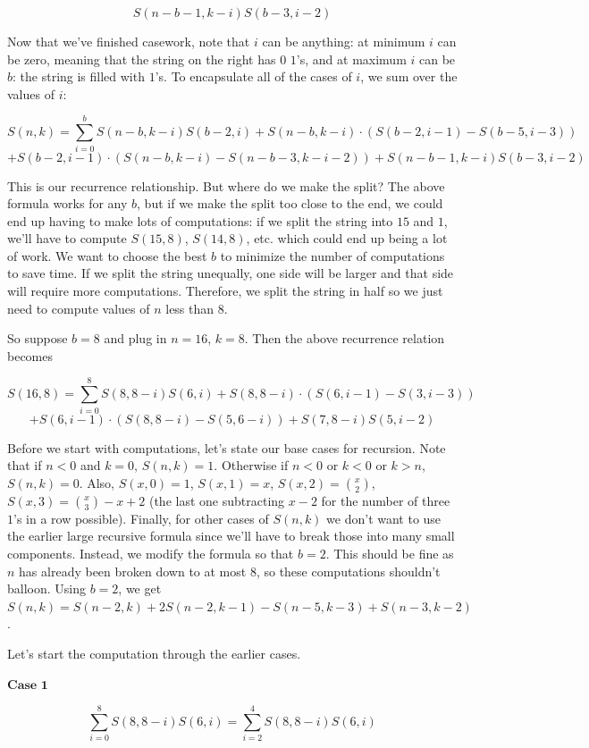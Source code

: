 \begin{enumerate}
 
 \[S(n-b-1,k-i)S(b-3,i-2)\]

 


 Now that we've finished casework, note that $i$ can be anything: at minimum $i$ can be zero, meaning that the string on the right has $0$ $1$'s, and at maximum $i$ can be $b$: the string is filled with $1$'s. To encapsulate all of the cases of $i$, we sum over the values of $i$:

 
 \[S(n,k) = \sum_{i = 0}^{b} S(n-b, k-i)S(b-2, i) + S(n-b,k-i) \cdot (S(b-2, i-1)-S(b-5, i-3))\]
 \[+ S(b-2, i-1) \cdot (S(n-b, k-i)-S(n-b-3, k-i-2)) + S(n-b-1,k-i)S(b-3,i-2)\]

 
This is our recurrence relationship. But where do we make the split? The above formula works for any $b$, but if we make the split too close to the end, we could end up having to make lots of computations: if we split the string into $15$ and $1$, we'll have to compute $S(15,8)$, $S(14,8)$, etc. which could end up being a lot of work. We want to choose the best $b$ to minimize the number of computations to save time. If we split the string unequally, one side will be larger and that side will require more computations. Therefore, we split the string in half so we just need to compute values of $n$ less than $8$.

 So suppose $b = 8$ and plug in $n=16$, $k=8$. Then the above recurrence relation becomes 

 
 \[S(16,8) = \sum_{i = 0}^{8} S(8, 8-i)S(6, i) + S(8,8-i) \cdot (S(6, i-1)-S(3, i-3))\]
 \[+ S(6, i-1) \cdot (S(8, 8-i)-S(5, 6-i)) + S(7,8-i)S(5,i-2)\]

 
Before we start with computations, let's state our base cases for recursion. Note that if $n<0$ and $k = 0$, $S(n,k) = 1$. Otherwise if $n<0$ or $k<0$ or $k>n$, $S(n,k) = 0$. Also, $S(x,0) = 1$, $S(x,1) = x$, $S(x,2) = \binom{x}{2}$, $S(x,3) = \binom{x}{3}-x+2$ (the last one subtracting $x-2$ for the number of three $1$'s in a row possible). Finally, for other cases of $S(n,k)$ we don't want to use the earlier large recursive formula since we'll have to break those into many small components. Instead, we modify the formula so that $b=2$. This should be fine as $n$ has already been broken down to at most $8$, so these computations shouldn't balloon. Using $b=2$, we get $S(n,k) = S(n-2,k) + 2S(n-2,k-1) - S(n-5,k-3)+S(n-3,k-2)$.

 
Let's start the computation through the earlier cases. 

 $\textbf{Case 1}$

 \[\sum_{i = 0}^{8} S(8,8-i)S(6,i) = \sum_{i = 2}^{4} S(8,8-i)S(6,i)\]


\end{enumerate}
